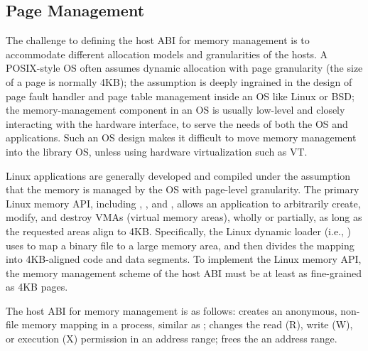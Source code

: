 \subsection{Page Management}
\label{sec:abi:memory}


The challenge to defining the host ABI for memory management
is to accommodate different allocation models and granularities of the hosts.
A POSIX-style OS often assumes dynamic allocation with page granularity (the size of a page is normally 4KB);
the assumption is deeply ingrained in the design of page fault handler and page table management
inside an OS like Linux or BSD;
the memory-management component in an OS
is usually low-level and closely interacting with the hardware interface,
to serve the needs of both the OS and applications.
Such an OS design makes it difficult to move memory management
into the library OS, unless using hardware virtualization such as VT.



Linux applications 
are generally developed and compiled under the assumption that the memory is managed
by the OS with page-level granularity.
The primary Linux memory API,
including , , and ,
allows an application
to arbitrarily create, modify, and destroy VMAs (virtual memory areas),
wholly or partially,
as long as the requested areas align to
4KB.
Specifically, the Linux dynamic loader (i.e., ) %
uses  to map a binary file to a large memory area,
and then divides the mapping into 4KB-aligned code and data segments.
To implement the Linux memory API,
the memory management scheme of the host ABI
must be at least as fine-grained as 4KB pages.


The host ABI for memory management is as follows:
 creates an anonymous, non-file memory mapping in a process, similar as ;
 changes the read (R), write (W), or execution (X) permission in an address range;
 frees the an address range.




